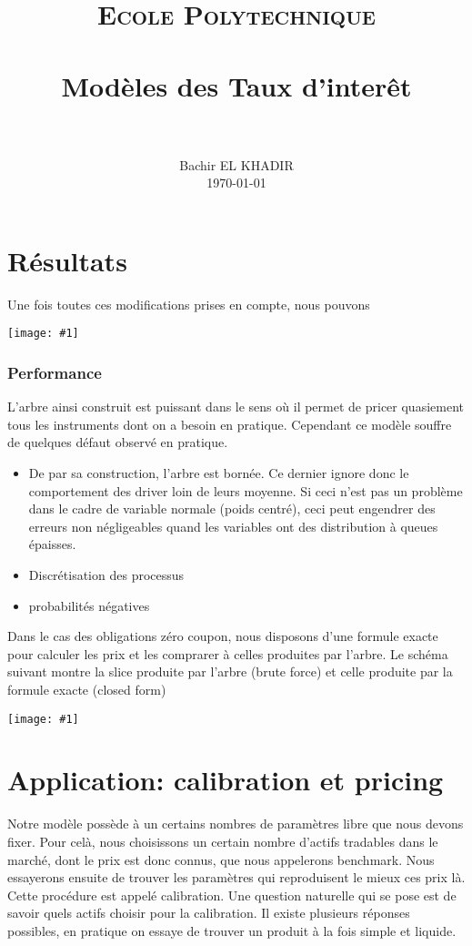 \documentclass[paper=a4, fontsize=11pt]{report}
\title{
		\usefont{OT1}{bch}{b}{n}
		\normalfont \normalsize \textsc{Ecole Polytechnique} \\ [25pt]
		\horrule{0.5pt} \\[0.4cm]
		\huge Modèles des Taux d'interêt \\
		\horrule{2pt} \\[0.5cm]
}
\author{
		\normalfont \normalsize
                Bachir EL KHADIR\\[-3pt] \normalsize
                \today	
}
\date{}
\numberwithin{equation}{section}		%
\numberwithin{figure}{section}			%
\numberwithin{table}{section}				%
\theoremstyle{definition}
\newcommand{\IMG}[3]{
  \begin{center}
    \texttt{[image: \#1]}%
    \end{center}
}
\begin{document}
\maketitle

\newpage
\tableofcontents




 


 


\chapter{Résultats}

Une fois toutes ces modifications prises en compte, nous pouvons 

\IMG{img/pending.jpg}{Slice 3D}{0.2}


\subsection{Performance}
L'arbre ainsi construit est puissant dans le sens où il permet de pricer quasiement tous les instruments dont on a besoin en pratique. Cependant ce modèle souffre de quelques défaut observé en pratique.

\begin{itemize}
\item  De par sa construction, l'arbre est bornée. Ce dernier ignore donc le comportement des driver loin de leurs moyenne. Si ceci n'est pas un problème dans le cadre de variable normale (poids centré), ceci peut engendrer des erreurs non négligeables quand les variables ont des distribution à queues épaisses.
\item  Discrétisation des processus
\item  probabilités négatives
\end{itemize}

Dans le cas des obligations zéro coupon, nous disposons d'une formule exacte pour calculer les prix et les comprarer à celles produites par l'arbre. 
Le schéma suivant montre la slice produite par l'arbre (brute force) et celle produite par la formule exacte (closed form) 
\IMG{img/slice.png}{Erreur bf vs cf Slice 3D}{0.7}

\chapter{Application: calibration et pricing}
Notre modèle possède à un certains nombres de paramètres libre que nous devons fixer. Pour celà, nous choisissons un certain nombre d'actifs tradables dans le marché, dont le prix est donc connus, que nous appelerons benchmark. Nous essayerons ensuite de trouver les paramètres qui reproduisent le mieux ces prix là. Cette procédure est appelé calibration.
Une question naturelle qui se pose est de savoir quels actifs choisir pour la calibration. Il existe plusieurs réponses possibles, en pratique on essaye de trouver un produit à la fois simple et liquide.
\end{document}
